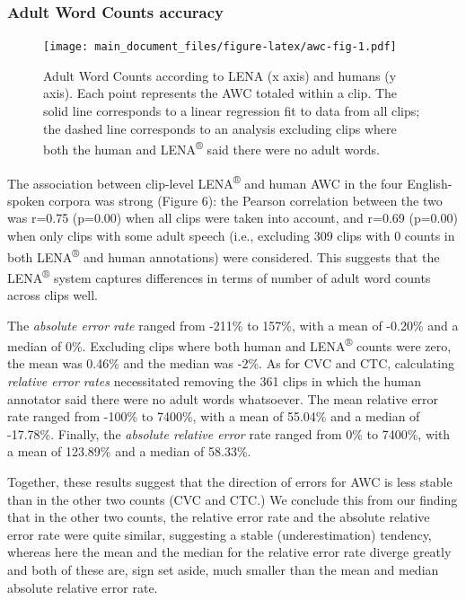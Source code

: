 \documentclass[english,table,man,floatsintext]{apa6}
\begin{document}
\hypertarget{adult-word-counts-accuracy}{%
\subsubsection{Adult Word Counts accuracy}\label{adult-word-counts-accuracy}}

\begin{figure}
\centering
\texttt{[image: main\_document\_files/figure-latex/awc-fig-1.pdf]}
\caption{\label{fig:awc-fig}Adult Word Counts according to LENA (x axis) and humans (y axis). Each point represents the AWC totaled within a clip. The solid line corresponds to a linear regression fit to data from all clips; the dashed line corresponds to an analysis excluding clips where both the human and LENA\textsuperscript{®} said there were no adult words.}
\end{figure}

The association between clip-level LENA\textsuperscript{®} and human AWC in the four English-spoken corpora was strong (Figure 6): the Pearson correlation between the two was r=0.75 (p=0.00) when all clips were taken into account, and r=0.69 (p=0.00) when only clips with some adult speech (i.e., excluding 309 clips with 0 counts in both LENA\textsuperscript{®} and human annotations) were considered. This suggests that the LENA\textsuperscript{®} system captures differences in terms of number of adult word counts across clips well.

The \emph{absolute error rate} ranged from -211\% to 157\%, with a mean of -0.20\% and a median of 0\%. Excluding clips where both human and LENA\textsuperscript{®} counts were zero,
the mean was 0.46\% and the median was -2\%. As for CVC and CTC, calculating \emph{relative error rates} necessitated removing the 361 clips in which the human annotator said there were no adult words whatsoever. The mean relative error rate ranged from -100\% to 7400\%, with a mean of 55.04\% and a median of -17.78\%. Finally, the \emph{absolute relative error} rate ranged from 0\% to 7400\%, with a mean of 123.89\% and a median of 58.33\%.

Together, these results suggest that the direction of errors for AWC is less stable than in the other two counts (CVC and CTC.) We conclude this from our finding that in the other two counts, the relative error rate and the absolute relative error rate were quite similar, suggesting a stable (underestimation) tendency, whereas here the mean and the median for the relative error rate diverge greatly and both of these are, sign set aside, much smaller than the mean and median absolute relative error rate.
\end{document}
